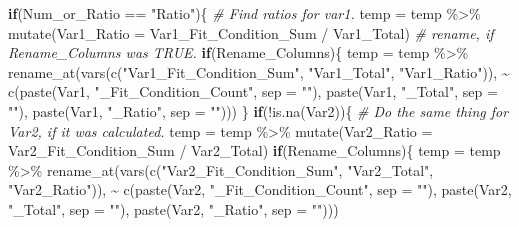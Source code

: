\documentclass[
]{article}
\newenvironment{Shaded}{\begin{snugshade}}{\end{snugshade}}
\newcommand{\AttributeTok}[1]{\textcolor[rgb]{0.77,0.63,0.00}{#1}}
\newcommand{\CommentTok}[1]{\textcolor[rgb]{0.56,0.35,0.01}{\textit{#1}}}
\newcommand{\ControlFlowTok}[1]{\textcolor[rgb]{0.13,0.29,0.53}{\textbf{#1}}}
\newcommand{\FunctionTok}[1]{\textcolor[rgb]{0.00,0.00,0.00}{#1}}
\newcommand{\NormalTok}[1]{#1}
\newcommand{\OtherTok}[1]{\textcolor[rgb]{0.56,0.35,0.01}{#1}}
\newcommand{\SpecialCharTok}[1]{\textcolor[rgb]{0.00,0.00,0.00}{#1}}
\newcommand{\StringTok}[1]{\textcolor[rgb]{0.31,0.60,0.02}{#1}}
\begin{document}
\begin{Shaded}
\begin{Highlighting}[]
  
  \ControlFlowTok{if}\NormalTok{(Num\_or\_Ratio }\SpecialCharTok{==} \StringTok{"Ratio"}\NormalTok{)\{}
    \CommentTok{\# Find ratios for var1.}
\NormalTok{    temp }\OtherTok{=}\NormalTok{ temp }\SpecialCharTok{\%\textgreater{}\%} \FunctionTok{mutate}\NormalTok{(}\AttributeTok{Var1\_Ratio =}\NormalTok{ Var1\_Fit\_Condition\_Sum }\SpecialCharTok{/}\NormalTok{ Var1\_Total)}
    \CommentTok{\# rename, if Rename\_Columns was TRUE.}
    \ControlFlowTok{if}\NormalTok{(Rename\_Columns)\{}
\NormalTok{      temp }\OtherTok{=}\NormalTok{ temp }\SpecialCharTok{\%\textgreater{}\%} 
        \FunctionTok{rename\_at}\NormalTok{(}\FunctionTok{vars}\NormalTok{(}\FunctionTok{c}\NormalTok{(}\StringTok{"Var1\_Fit\_Condition\_Sum"}\NormalTok{, }\StringTok{"Var1\_Total"}\NormalTok{, }\StringTok{"Var1\_Ratio"}\NormalTok{)),}
                  \SpecialCharTok{\textasciitilde{}} \FunctionTok{c}\NormalTok{(}\FunctionTok{paste}\NormalTok{(Var1, }\StringTok{"\_Fit\_Condition\_Count"}\NormalTok{, }\AttributeTok{sep =} \StringTok{""}\NormalTok{),}
                      \FunctionTok{paste}\NormalTok{(Var1, }\StringTok{"\_Total"}\NormalTok{, }\AttributeTok{sep =} \StringTok{""}\NormalTok{),}
                      \FunctionTok{paste}\NormalTok{(Var1, }\StringTok{"\_Ratio"}\NormalTok{, }\AttributeTok{sep =} \StringTok{""}\NormalTok{)))}
\NormalTok{    \}}
    \ControlFlowTok{if}\NormalTok{(}\SpecialCharTok{!}\FunctionTok{is.na}\NormalTok{(Var2))\{}
      \CommentTok{\# Do the same thing for Var2, if it was calculated.}
\NormalTok{      temp }\OtherTok{=}\NormalTok{ temp }\SpecialCharTok{\%\textgreater{}\%} 
        \FunctionTok{mutate}\NormalTok{(}\AttributeTok{Var2\_Ratio =}\NormalTok{ Var2\_Fit\_Condition\_Sum }\SpecialCharTok{/}\NormalTok{ Var2\_Total)}
      \ControlFlowTok{if}\NormalTok{(Rename\_Columns)\{}
\NormalTok{        temp }\OtherTok{=}\NormalTok{ temp }\SpecialCharTok{\%\textgreater{}\%} 
          \FunctionTok{rename\_at}\NormalTok{(}\FunctionTok{vars}\NormalTok{(}\FunctionTok{c}\NormalTok{(}\StringTok{"Var2\_Fit\_Condition\_Sum"}\NormalTok{, }
                           \StringTok{"Var2\_Total"}\NormalTok{, }\StringTok{"Var2\_Ratio"}\NormalTok{)),}
                    \SpecialCharTok{\textasciitilde{}} \FunctionTok{c}\NormalTok{(}\FunctionTok{paste}\NormalTok{(Var2, }\StringTok{"\_Fit\_Condition\_Count"}\NormalTok{, }\AttributeTok{sep =} \StringTok{""}\NormalTok{),}
                        \FunctionTok{paste}\NormalTok{(Var2, }\StringTok{"\_Total"}\NormalTok{, }\AttributeTok{sep =} \StringTok{""}\NormalTok{),}
                        \FunctionTok{paste}\NormalTok{(Var2, }\StringTok{"\_Ratio"}\NormalTok{, }\AttributeTok{sep =} \StringTok{""}\NormalTok{)))}

\end{Highlighting}
\end{Shaded}
\end{document}
